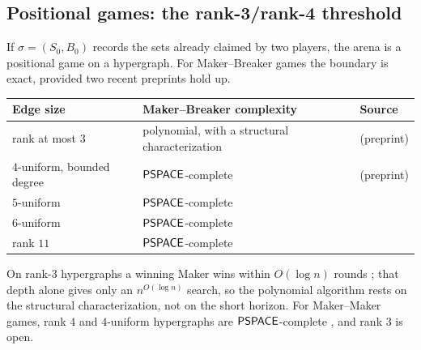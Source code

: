 \subsection{Positional games: the rank-3/rank-4 threshold}\label{ssec:positional}
If $\sigma=(S_0,B_0)$ records the sets already claimed by two players, the arena is a positional game on a hypergraph. For Maker--Breaker games the boundary is exact, provided two recent preprints hold up.
\begin{center}\small
\begin{tabularx}{\linewidth}{@{}l>{\raggedright\arraybackslash}Xl@{}}
\toprule
Edge size & Maker--Breaker complexity & Source\\ \midrule
rank at most $3$ & polynomial, with a structural characterization & \cite{GGS} (preprint)\\
$4$-uniform, bounded degree & $\mathsf{PSPACE}$-complete & \cite{Galliot25} (preprint)\\
$5$-uniform & $\mathsf{PSPACE}$-complete & \cite{Koepke}\\
$6$-uniform & $\mathsf{PSPACE}$-complete & \cite{RahmanWatson}\\
rank $11$ & $\mathsf{PSPACE}$-complete & \cite{SchaeferGames}\\
\bottomrule
\end{tabularx}
\end{center}
On rank-$3$ hypergraphs a winning Maker wins within $O(\log n)$ rounds \cite{GGS}; that depth alone gives only an $n^{O(\log n)}$ search, so the polynomial algorithm rests on the structural characterization, not on the short horizon. For Maker--Maker games, rank $4$ and $4$-uniform hypergraphs are $\mathsf{PSPACE}$-complete \cite{GalliotSenizergues,Galliot25}, and rank $3$ is open.

